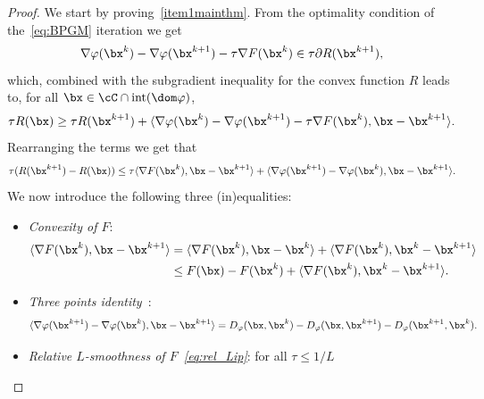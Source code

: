 \documentclass[11pt]{amsart}
\begin{document}
\begin{proof}  We start by proving~\cref{item1mainthm}. 
From the optimality condition of the~\eqref{eq:BPGM} iteration we get 
\begin{equation}
    \nabla \varphi(\bx^k) - \nabla \varphi (\bx^{k+1}) - \tau \nabla F(\bx^k) \in \tau \partial R(\bx^{k+1}),
\end{equation}
which, combined with the subgradient inequality for the convex function $R$ leads to, for all $\bx \in \cC\cap \mathrm{int}(\dom \varphi) $,
$$\tau R(\bx) \geq \tau R(\bx^{k+1}) + \langle\nabla \varphi(\bx^k) - \nabla \varphi (\bx^{k+1}) -  \tau \nabla F(\bx^k), \bx - \bx^{k+1} \rangle \notag. $$
Rearranging the terms we get that
\begin{equation}\label{eq:subgrad_ineq}
         \tau( R(\bx^{k+1}) - R(\bx)) \leq \tau \langle \nabla F(\bx^k), \bx - \bx^{k+1} \rangle  + \langle\nabla \varphi(\bx^{k+1}) - \nabla \varphi (\bx^{k}), \bx - \bx^{k+1} \rangle .
\end{equation}
We now introduce the following three (in)equalities:
\begin{itemize}
    \item  \textit{Convexity of $F$}:
    \begin{align*}
        \langle \nabla F(\bx^k), \bx - \bx^{k+1} \rangle &= \langle \nabla F(\bx^k), \bx - \bx^{k} \rangle + \langle \nabla F(\bx^k), \bx^k - \bx^{k+1} \rangle \\
        & \leq F(\bx) - F(\bx^{k})  + \langle \nabla F(\bx^k), \bx^k - \bx^{k+1} \rangle .
    \end{align*}
    \item \textit{Three points identity~\cite{ChenTeboulle1993}}:
    \begin{equation*}
        \langle \nabla \varphi(\bx^{k+1}) - \nabla \varphi(\bx^k), \bx - \bx^{k+1} \rangle = D_\varphi(\bx,\bx^k) - D_\varphi(\bx,\bx^{k+1}) - D_\varphi(\bx^{k+1},\bx^k) .
    \end{equation*}
    \item \textit{Relative $L$-smoothness of $F$~\eqref{eq:rel_Lip}}: for all $\tau \leq 1/L$

\end{itemize}
\end{proof}
\end{document}
